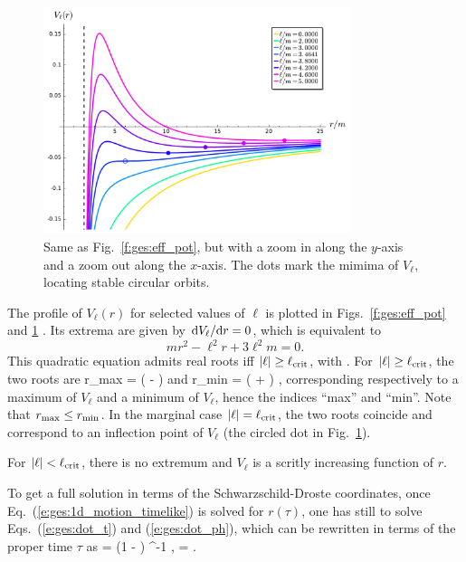 \begin{figure}
\centerline{\includegraphics[width=0.8\textwidth]{ges_eff_pot_zoom.pdf}}
\caption[]{\label{f:ges:eff_pot_zoom} \footnotesize
Same as Fig.~\ref{f:ges:eff_pot}, but with a zoom in along the $y$-axis
and a zoom out along the $x$-axis. The dots mark the mimima of
$V_{\ell}$, locating stable circular orbits.}
\end{figure}

The profile  of $V_{\ell}(r)$ for selected values of $\ell$ is
plotted in Figs.~\ref{f:ges:eff_pot} and \ref{f:ges:eff_pot_zoom} .
Its extrema are given by
$\mathrm{d} V_{\ell}/\mathrm{d} r=0$, which is equivalent to
\[
    m r^2 - \ell^2 r + 3 \ell^2 m = 0 .
\]
This quadratic equation admits real roots iff $|\ell| \geq \ell_{\rm crit}$,
with
\be \label{e:ges:ell_crit}
   .
\ee
For $|\ell| \geq \ell_{\rm crit}$, the two roots are
\be
    r_{\rm max} =  \left( \ell -
     \right)
    \qquad\mbox{and}\qquad
    r_{\rm min} =  \left( \ell +
     \right) ,
\ee
corresponding respectively to a maximum of $V_{\ell}$ and a minimum
of $V_{\ell}$, hence the indices ``max'' and ``min''. Note that
$r_{\rm max} \leq r_{\rm min}$.
In the marginal case $|\ell| = \ell_{\rm crit}$, the two roots
coincide and correspond to an inflection point of $V_{\ell}$ (the circled
dot in Fig.~\ref{f:ges:eff_pot_zoom}).

For $|\ell| < \ell_{\rm crit}$, there is no extremum and
$V_{\ell}$ is a scritly increasing function of $r$.


To get a full solution in terms of the Schwarzschild-Droste coordinates,
once Eq.~(\ref{e:ges:1d_motion_timelike}) is solved for $r(\tau)$,
one has still to solve Eqs.~(\ref{e:ges:dot_t}) and (\ref{e:ges:dot_ph}),
which can be rewritten in terms of the proper time $\tau$ as
\be \label{e:ges:Dt_Dtau}
     = \veps \left(1 -  \right) ^{-1} ,
\ee
\be \label{e:ges:Dph_Dtau}
    \frac{\D\ph}{\D\tau} =   .
\ee


